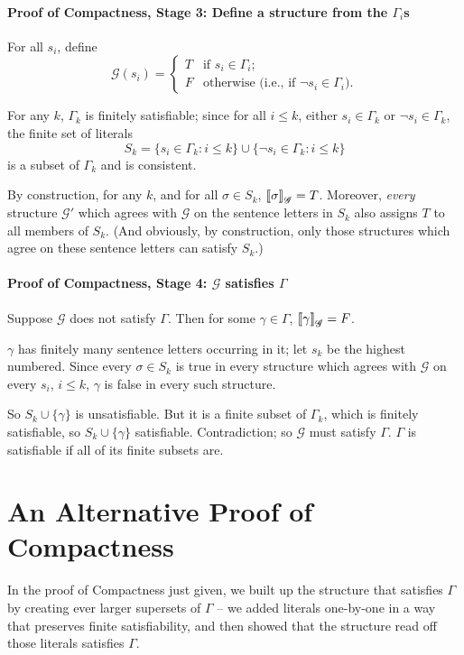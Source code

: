 \paragraph{Proof of Compactness, Stage 3: Define a structure from the $\Gamma_{i}$s}

For all $s_{i}$, define \begin{equation*}
	\mathscr{G}(s_{i}) = \begin{cases}
		T & \text{if } s_{i} \in\Gamma_{i};\\
		F & \text{otherwise (i.e., if $\neg s_{i}\in\Gamma_{i}$)}.
	\end{cases}
\end{equation*}

For any $k$, $\Gamma_{k}$ is finitely satisfiable; since for all $i\leqslant k$, either $s_{i}\in\Gamma_{k}$ or $\neg s_{i}\in\Gamma_{k}$, the finite set of literals $$S_{k} = \{s_{i}\in\Gamma_{k}:i\leqslant k\}\cup\{\neg s_{i}\in\Gamma_{k}:i\leqslant k\}$$
is a subset of $\Gamma_{k}$ and is consistent. 

By construction, for any $k$, and for all $\sigma\in S_{k}$, $\left\llbracket \sigma\right\rrbracket_{\mathscr{G}}=T$. Moreover, \emph{every} structure $\mathscr{G}'$ which agrees with $\mathscr{G}$ on the sentence letters in $S_{k}$ also assigns $T$ to all members of $S_{k}$.  (And obviously, by construction, only those structures which agree on these sentence letters can satisfy $S_{k}$.)

\paragraph{Proof of Compactness, Stage 4: $\mathscr{G}$ satisfies $\Gamma$}

Suppose $\mathscr{G}$ does not satisfy $\Gamma$.
Then for some $\gamma\in\Gamma$, $\left\llbracket \gamma\right\rrbracket_{\mathscr{G}}=F$.

$\gamma$ has finitely many sentence letters occurring in it; let $s_{k}$ be the highest numbered. Since every $\sigma\in S_{k}$  is true in every structure which agrees with $\mathscr{G}$ on every $s_{i}$, $i\leqslant k$, $\gamma$ is false in every such structure.

So $S_{k}\cup\{\gamma\}$ is unsatisfiable. But it is a finite subset of $\Gamma_{k}$, which is finitely satisfiable, so $S_{k}\cup\{\gamma\}$ satisfiable. Contradiction; so $\mathscr{G}$ must satisfy $\Gamma$. $\Gamma$ is satisfiable if all of its finite subsets are.

\section[Alternative Proof of Compactness]{An Alternative Proof of Compactness}\label{altcomp} In the proof of Compactness just given, we built up the structure that satisfies $\Gamma$ by creating ever larger supersets of $\Gamma$ – we added literals one-by-one in a way that preserves finite satisfiability, and then showed that the structure read off those literals satisfies $\Gamma$.

